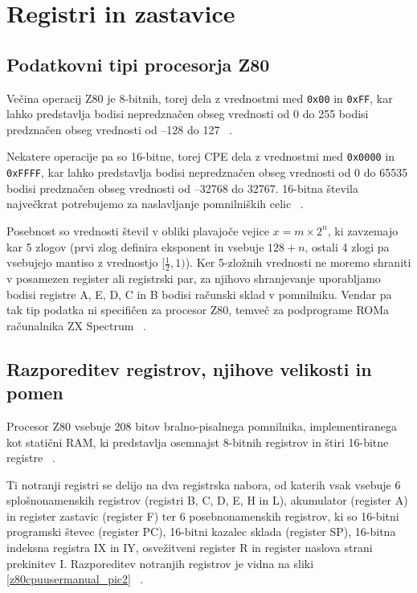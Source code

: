 \documentclass[a4paper, 12pt, openright]{book}
\begin{document}
    \section{Registri in zastavice}

    \subsection{Podatkovni tipi procesorja Z80}
    Večina operacij Z80 je 8-bitnih, torej dela z vrednostmi med \texttt{0x00} in
    \texttt{0xFF}, kar lahko predstavlja bodisi nepredznačen obseg vrednosti od 0
    do 255 bodisi predznačen obseg vrednosti od --128 do 127 ~\cite{strojnijezikzaprocesorz80}.

    Nekatere operacije pa so 16-bitne, torej CPE dela z vrednostmi med \texttt{0x0000}
    in \texttt{0xFFFF}, kar lahko predstavlja bodisi nepredznačen obseg
    vrednosti od 0 do 65535 bodisi predznačen obseg vrednosti od --32768 do
    32767. 16-bitna števila največkrat potrebujemo za naslavljanje pomnilniških
    celic ~\cite{strojnijezikzaprocesorz80}.

    Posebnost so vrednosti števil v obliki plavajoče vejice $x=m\times 2^{n}$,
    ki zavzemajo kar 5 zlogov (prvi zlog definira eksponent in vsebuje $128+n$,
    ostali 4 zlogi pa vsebujejo mantiso z vrednostjo $[\frac{1 }{2}, 1)$). Ker 5-zložnih
    vrednosti ne moremo shraniti v posamezen register ali registrski par, za njihovo
    shranjevanje uporabljamo bodisi registre A, E, D, C in B bodisi računski
    sklad v pomnilniku. Vendar pa tak tip podatka ni specifičen za procesor Z80,
    temveč za podprograme ROMa računalnika ZX Spectrum ~\cite{strojnijezikzaprocesorz80}.

    \subsection{Razporeditev registrov, njihove velikosti in pomen}

    Procesor Z80 vsebuje 208 bitov bralno-pisalnega pomnilnika, implementiranega kot
    statični RAM, ki predstavlja osemnajst 8-bitnih registrov in štiri 16-bitne
    registre ~\cite{z80cpuusermanual}.

    Ti notranji registri se delijo na dva registrska nabora, od katerih vsak
    vsebuje 6 splošnonamenskih registrov (registri B, C, D, E, H in L), akumulator
    (register A) in register zastavic (register F) ter 6 posebnonamenskih registrov,
    ki so 16-bitni programski števec (register PC), 16-bitni kazalec sklada (register
    SP), 16-bitna indeksna registra IX in IY, osvežitveni register R in register naslova
    strani prekinitev I. Razporeditev notranjih registrov je vidna na sliki
    \ref{z80cpuusermanual_pic2} ~\cite{strojnijezikzaprocesorz80, z80cpuusermanual}.
\end{document}
